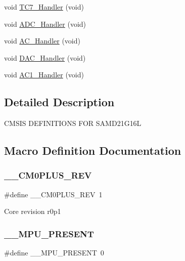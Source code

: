 \begin{DoxyCompactItemize}
void \mbox{\hyperlink{group___s_a_m_d21_g16_l__cmsis_gaad7f4f49bc6f24dd65305c09273737d9}{T\+C7\+\_\+\+Handler}} (void)
\item 
void \mbox{\hyperlink{group___s_a_m_d21_g16_l__cmsis_gada953331e0adc056867e918bc80ce8a5}{A\+D\+C\+\_\+\+Handler}} (void)
\item 
void \mbox{\hyperlink{group___s_a_m_d21_g16_l__cmsis_ga591d634cc8d92aabdba828034e30ec92}{A\+C\+\_\+\+Handler}} (void)
\item 
void \mbox{\hyperlink{group___s_a_m_d21_g16_l__cmsis_ga8d4b8614e1c8468e26d48a962c57dc70}{D\+A\+C\+\_\+\+Handler}} (void)
\item 
void \mbox{\hyperlink{group___s_a_m_d21_g16_l__cmsis_ga243719b70b3d2dae139dcec5b84eac8f}{A\+C1\+\_\+\+Handler}} (void)
\end{DoxyCompactItemize}


\subsection{Detailed Description}
C\+M\+S\+IS D\+E\+F\+I\+N\+I\+T\+I\+O\+NS F\+OR S\+A\+M\+D21\+G16L 

\subsection{Macro Definition Documentation}
\mbox{\label{group___s_a_m_d21_g16_l__cmsis_ga2b7180ed347a0e902c5765deb46e650e}} 
\subsubsection{\texorpdfstring{\_\_CM0PLUS\_REV}{\_\_CM0PLUS\_REV}}
{\footnotesize\ttfamily \#define \+\_\+\+\_\+\+C\+M0\+P\+L\+U\+S\+\_\+\+R\+EV~1}

Core revision r0p1 \mbox{\label{group___s_a_m_d21_g16_l__cmsis_ga4127d1b31aaf336fab3d7329d117f448}} 
\subsubsection{\texorpdfstring{\_\_MPU\_PRESENT}{\_\_MPU\_PRESENT}}
{\footnotesize\ttfamily \#define \+\_\+\+\_\+\+M\+P\+U\+\_\+\+P\+R\+E\+S\+E\+NT~0}

